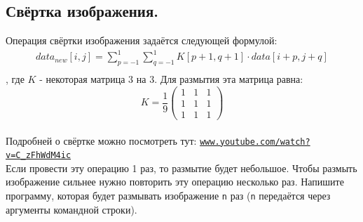 \documentclass{article}
\begin{document}
\begin{multicols}{3}
\begin{center}
\end{center}
\end{multicols}


\subsection{Свёртка изображения.}
Операция свёртки изображения задаётся следующей формулой:
\begin{align*}
data_{new}[i, j] = \sum_{p=-1}^{1} \sum_{q=-1}^{1} K[p+1, q+1] \cdot data[i+p, j+q]\\
\end{align*}
, где $K$ - некоторая матрица 3 на 3. Для размытия эта матрица равна:
$$
K = 
\frac{1}{9}
\begin{pmatrix}
1 & 1 & 1 \\
1 & 1 & 1 \\
1 & 1 & 1
\end{pmatrix}
$$\\

Подробней о свёртке можно посмотреть тут:
 \href{https://www.youtube.com/watch?v=C_zFhWdM4ic&t=74s}{\texttt{www.youtube.com/watch?v=C\_zFhWdM4ic}}\\
Если провести эту операцию 1 раз, то размытие будет небольшое. Чтобы размыть изображение сильнее нужно повторить эту операцию несколько раз.
Напишите программу, которая будет размывать изображение \texttt{n} раз (\texttt{n} передаётся через аргументы командной строки).

\end{document}
